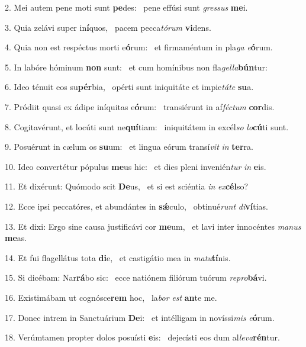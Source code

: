 2. Mei autem pene moti sunt \textbf{pe}des: \ast\  pene effúsi sunt \textit{gres}\textit{sus} \textbf{me}i.\

3. Quia zelávi super in\textbf{í}quos, \ast\  pacem pecca\textit{tó}\textit{rum} \textbf{vi}dens.\

4. Quia non est respéctus morti e\textbf{ó}rum: \ast\  et firmaméntum in pla\textit{ga} \textit{e}\textbf{ó}rum.\

5. In labóre hóminum \textbf{non} sunt: \ast\  et cum homínibus non fla\textit{gel}\textit{la}\textbf{bún}tur:\

6. Ideo ténuit eos su\textbf{pér}bia, \ast\  opérti sunt iniquitáte et impie\textit{tá}\textit{te} \textbf{su}a.\

7. Pródiit quasi ex ádipe iníquitas e\textbf{ó}rum: \ast\  transiérunt in af\textit{féc}\textit{tum} \textbf{cor}dis.\

8. Cogitavérunt, et locúti sunt ne\textbf{quí}tiam: \ast\  iniquitátem in excél\textit{so} \textit{lo}\textbf{cú}ti sunt.\

9. Posuérunt in cælum os \textbf{su}um: \ast\  et lingua eórum transí\textit{vit} \textit{in} \textbf{ter}ra.\

10. Ideo convertétur pópulus \textbf{me}us hic: \ast\  et dies pleni invenién\textit{tur} \textit{in} \textbf{e}is.\

11. Et dixérunt: Quómodo scit \textbf{De}us, \ast\  et si est sciéntia \textit{in} \textit{ex}\textbf{cél}so?\

12. Ecce ipsi peccatóres, et abundántes in \textbf{sǽ}culo, \ast\  obtinué\textit{runt} \textit{di}\textbf{ví}tias.\

13. Et dixi: Ergo sine causa justificávi cor \textbf{me}um, \ast\  et lavi inter innocéntes \textit{ma}\textit{nus} \textbf{me}as.\

14. Et fui flagellátus tota \textbf{di}e, \ast\  et castigátio mea in \textit{ma}\textit{tu}\textbf{tí}nis.\

15. Si dicébam: Nar\textbf{rá}bo sic: \ast\  ecce natiónem filiórum tuórum \textit{re}\textit{pro}\textbf{bá}vi.\

16. Existimábam ut cognósce\textbf{rem} hoc, \ast\  la\textit{bor} \textit{est} \textbf{an}te me.\

17. Donec intrem in Sanctuárium \textbf{De}i: \ast\  et intélligam in novíssi\textit{mis} \textit{e}\textbf{ó}rum.\

18. Verúmtamen propter dolos posuísti \textbf{e}is: \ast\  dejecísti eos dum al\textit{le}\textit{va}\textbf{rén}tur.\

